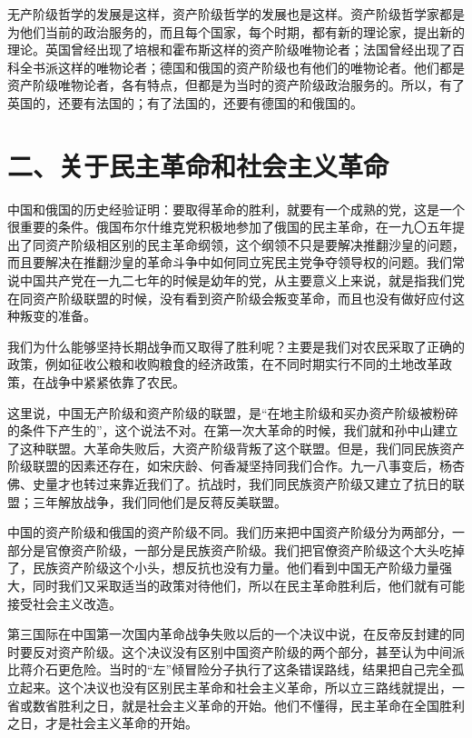 无产阶级哲学的发展是这样，资产阶级哲学的发展也是这样。资产阶级哲学家都是为他们当前的政治服务的，而且每个国家，每个时期，都有新的理论家，提出新的理论。英国曾经出现了培根和霍布斯这样的资产阶级唯物论者；法国曾经出现了百科全书派这样的唯物论者；德国和俄国的资产阶级也有他们的唯物论者。他们都是资产阶级唯物论者，各有特点，但都是为当时的资产阶级政治服务的。所以，有了英国的，还要有法国的；有了法国的，还要有德国的和俄国的。

\section{二、关于民主革命和社会主义革命}

中国和俄国的历史经验证明：要取得革命的胜利，就要有一个成熟的党，这是一个很重要的条件。俄国布尔什维克党积极地参加了俄国的民主革命，在一九〇五年提出了同资产阶级相区别的民主革命纲领，这个纲领不只是要解决推翻沙皇的问题，而且要解决在推翻沙皇的革命斗争中如何同立宪民主党争夺领导权的问题。我们常说中国共产党在一九二七年的时候是幼年的党，从主要意义上来说，就是指我们党在同资产阶级联盟的时候，没有看到资产阶级会叛变革命，而且也没有做好应付这种叛变的准备。

我们为什么能够坚持长期战争而又取得了胜利呢？主要是我们对农民采取了正确的政策，例如征收公粮和收购粮食的经济政策，在不同时期实行不同的土地改革政策，在战争中紧紧依靠了农民。

这里说，中国无产阶级和资产阶级的联盟，是“在地主阶级和买办资产阶级被粉碎的条件下产生的”，这个说法不对。在第一次大革命的时候，我们就和孙中山建立了这种联盟。大革命失败后，大资产阶级背叛了这个联盟。但是，我们同民族资产阶级联盟的因素还存在，如宋庆龄、何香凝坚持同我们合作。九一八事变后，杨杏佛、史量才也转过来靠近我们了。抗战时，我们同民族资产阶级又建立了抗日的联盟；三年解放战争，我们同他们是反蒋反美联盟。

中国的资产阶级和俄国的资产阶级不同。我们历来把中国资产阶级分为两部分，一部分是官僚资产阶级，一部分是民族资产阶级。我们把官僚资产阶级这个大头吃掉了，民族资产阶级这个小头，想反抗也没有力量。他们看到中国无产阶级力量强大，同时我们又采取适当的政策对待他们，所以在民主革命胜利后，他们就有可能接受社会主义改造。

第三国际在中国第一次国内革命战争失败以后的一个决议中说，在反帝反封建的同时要反对资产阶级。这个决议没有区别中国资产阶级的两个部分，甚至认为中间派比蒋介石更危险。当时的“左”倾冒险分子执行了这条错误路线，结果把自己完全孤立起来。这个决议也没有区别民主革命和社会主义革命，所以立三路线就提出，一省或数省胜利之日，就是社会主义革命的开始。他们不懂得，民主革命在全国胜利之日，才是社会主义革命的开始。

